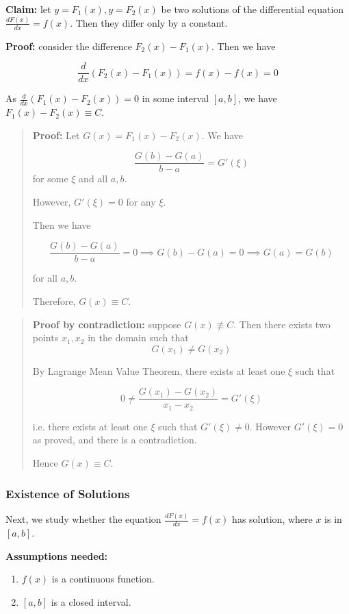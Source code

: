 \textbf{Claim:} let $y = F_1(x), y = F_2(x)$ be two solutions of the differential equation $\frac{dF(x)}{dx} = f(x)$. Then they differ only by a constant.

\textbf{Proof:} consider the difference $F_2(x) - F_1(x)$. Then we have

$$ \frac{d}{dx}(F_2(x) - F_1(x)) = f(x) - f(x) = 0 $$

As $ \frac{d}{dx}(F_1(x) - F_2(x)) = 0 $ in some interval $[a, b]$, we have $F_1(x) - F_2(x) \equiv C$.

\begin{quote}
    \textbf{Proof:} Let $G(x) = F_1(x) - F_2(x)$. We have
    
    $$ \frac{G(b) - G(a)}{b - a} = G'(\xi) $$ for some $\xi$ and all $a, b$.
    
    However, $G'(\xi) = 0$ for any $\xi$.
    
    Then we have
    
    $$ \frac{G(b) - G(a)}{b - a} = 0 \implies G(b) - G(a) = 0 \implies G(a) = G(b) $$
    
    for all $a, b$.
    
    Therefore, $G(x) \equiv C$.
\end{quote}

\begin{quote}
    \textbf{Proof by contradiction:} suppose $G(x) \not\equiv C$. Then there exists two points $x_1, x_2$ in the domain such that $$ G(x_1) \not = G(x_2) $$

    By Lagrange Mean Value Theorem, there exists at least one $\xi$ such that
    
    $$ 0 \not = \frac{G(x_1) - G(x_2)}{x_1 - x_2} = G'(\xi) $$
    
    i.e. there exists at least one $\xi$ such that $G'(\xi) \not = 0$. However $G'(\xi) = 0$ as proved, and there is a contradiction.
    
    Hence $G(x) \equiv C$.
    
\end{quote}

\subsubsection{Existence of Solutions}

Next, we study whether the equation $\frac{dF(x)}{dx} = f(x)$ has solution, where $x$ is in $[a, b]$.

\textbf{Assumptions needed:}

\begin{enumerate}
    \item $f(x)$ is a continuous function.
    \item $[a, b]$ is a closed interval.
\end{enumerate}

